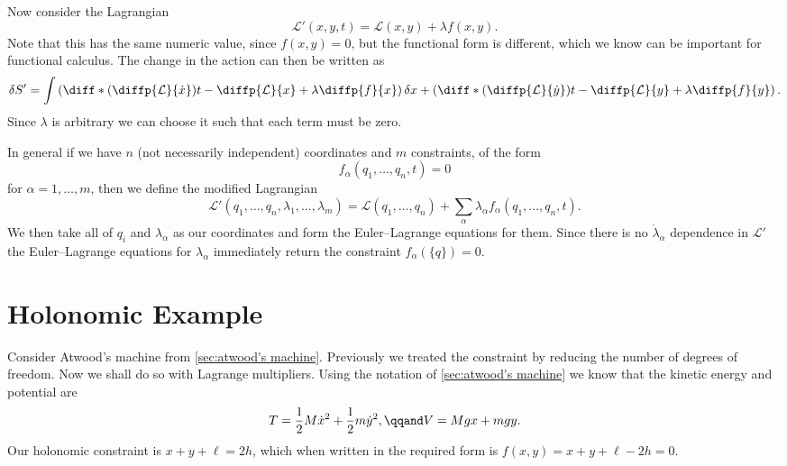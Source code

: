 \documentclass[fleqn]{NotesClass}
\newcommand*{\lagrangian}{\mathcal{L}}
\begin{document}
    Now consider the Lagrangian
    \begin{equation}
        \lagrangian'(x, y, t) = \lagrangian(x, y) + \lambda f(x, y).
    \end{equation}
    Note that this has the same numeric value, since \(f(x, y) = 0\), but the functional form is different, which we know can be important for functional calculus.
    The change in the action can then be written as
    \begin{equation}
        \delta S' = \int \left( \diff*{\left( \diffp{\lagrangian}{\dot{x}} \right)}{t} - \diffp{\lagrangian}{x} + \lambda\diffp{f}{x} \right)\delta x + \left( \diff*{\left( \diffp{\lagrangian}{\dot{y}} \right)}{t} - \diffp{\lagrangian}{y} + \lambda\diffp{f}{y} \right).
    \end{equation}
    Since \(\lambda\) is arbitrary we can choose it such that each term must be zero.
    
    In general if we have \(n\) (not necessarily independent) coordinates and \(m\) constraints, of the form
    \begin{equation}
        f_\alpha(q_1, \dotsc, q_n, t) = 0
    \end{equation}
    for \(\alpha = 1, \dotsc, m\), then we define the modified Lagrangian
    \begin{equation}
        \lagrangian'(q_1, \dotsc, q_n, \lambda_1, \dotsc, \lambda_m) = \lagrangian(q_1, \dotsc, q_n) + \sum_{\alpha} \lambda_\alpha f_\alpha(q_1, \dotsc, q_n, t).
    \end{equation}
    We then take all of \(q_i\) and \(\lambda_\alpha\) as our coordinates and form the Euler--Lagrange equations for them.
    Since there is no \(\dot{\lambda}_\alpha\) dependence in \(\lagrangian'\) the Euler--Lagrange equations for \(\lambda_\alpha\) immediately return the constraint \(f_{\alpha}(\{q\}) = 0\).
    
    \section{Holonomic Example}
    Consider Atwood's machine from \cref{sec:atwood's machine}.
    Previously we treated the constraint by reducing the number of degrees of freedom.
    Now we shall do so with Lagrange multipliers.
    Using the notation of \cref{sec:atwood's machine} we know that the kinetic energy and potential are
    \begin{equation}
        T = \frac{1}{2}M\dot{x}^2 + \frac{1}{2}m\dot{y}^2, \qqand V = Mgx + mgy.
    \end{equation}
    Our holonomic constraint is \(x + y + \ell = 2h\), which when written in the required form is \(f(x, y) = x + y + \ell - 2h = 0\).
    
\end{document}
